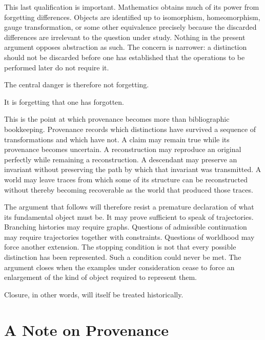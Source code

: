 \documentclass[
  11pt,
  a4paper,
  DIV=12,
  BCOR=0mm,
  parskip=half-
]{scrartcl}
\theoremstyle{definition}
\theoremstyle{plain}
\theoremstyle{remark}
\begin{document}
This last qualification is important. Mathematics obtains much of its power
from forgetting differences. Objects are identified up to isomorphism,
homeomorphism, gauge transformation, or some other equivalence precisely
because the discarded differences are irrelevant to the question under study.
Nothing in the present argument opposes abstraction as such. The concern is
narrower: a distinction should not be discarded before one has established
that the operations to be performed later do not require it.

The central danger is therefore not forgetting.

It is forgetting that one has forgotten.

This is the point at which provenance becomes more than bibliographic
bookkeeping. Provenance records which distinctions have survived a sequence of
transformations and which have not. A claim may remain true while its
provenance becomes uncertain. A reconstruction may reproduce an original
perfectly while remaining a reconstruction. A descendant may preserve an
invariant without preserving the path by which that invariant was transmitted.
A world may leave traces from which some of its structure can be reconstructed
without thereby becoming recoverable as the world that produced those traces.

The argument that follows will therefore resist a premature declaration of
what its fundamental object must be. It may prove sufficient to speak of
trajectories. Branching histories may require graphs. Questions of admissible
continuation may require trajectories together with constraints. Questions of
worldhood may force another extension. The stopping condition is not that every
possible distinction has been represented. Such a condition could never be
met. The argument closes when the examples under consideration cease to force
an enlargement of the kind of object required to represent them.

Closure, in other words, will itself be treated historically.

\clearpage


\section*{A Note on Provenance}
\end{document}
